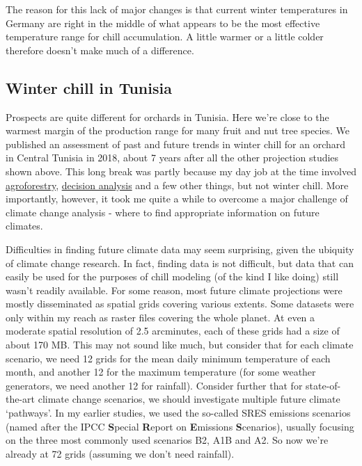\documentclass[
]{book}
\begin{document}
The reason for this lack of major changes is that current winter temperatures in Germany are right in the middle of what appears to be the most effective temperature range for chill accumulation. A little warmer or a little colder therefore doesn't make much of a difference.

\hypertarget{winter-chill-in-tunisia}{%
\subsection{Winter chill in Tunisia}\label{winter-chill-in-tunisia}}

Prospects are quite different for orchards in Tunisia. Here we're close to the warmest margin of the production range for many fruit and nut tree species. We published an assessment of past and future trends in winter chill for an orchard in Central Tunisia in 2018, about 7 years after all the other projection studies shown above. This long break was partly because my day job at the time involved \href{https://www.worldagroforestry.org/}{agroforestry}, \href{https://thesolutionsjournal.com/2016/09/17/decision-focused-agricultural-research/}{decision analysis} and a few other things, but not winter chill. More importantly, however, it took me quite a while to overcome a major challenge of climate change analysis - where to find appropriate information on future climates.

Difficulties in finding future climate data may seem surprising, given the ubiquity of climate change research. In fact, finding data is not difficult, but data that can easily be used for the purposes of chill modeling (of the kind I like doing) still wasn't readily available. For some reason, most future climate projections were mostly disseminated as spatial grids covering various extents. Some datasets were only within my reach as raster files covering the whole planet. At even a moderate spatial resolution of 2.5 arcminutes, each of these grids had a size of about 170 MB. This may not sound like much, but consider that for each climate scenario, we need 12 grids for the mean daily minimum temperature of each month, and another 12 for the maximum temperature (for some weather generators, we need another 12 for rainfall). Consider further that for state-of-the-art climate change scenarios, we should investigate multiple future climate `pathways'. In my earlier studies, we used the so-called SRES emissions scenarios (named after the IPCC \textbf{S}pecial \textbf{R}eport on \textbf{E}missions \textbf{S}cenarios), usually focusing on the three most commonly used scenarios B2, A1B and A2. So now we're already at 72 grids (assuming we don't need rainfall).
\end{document}
